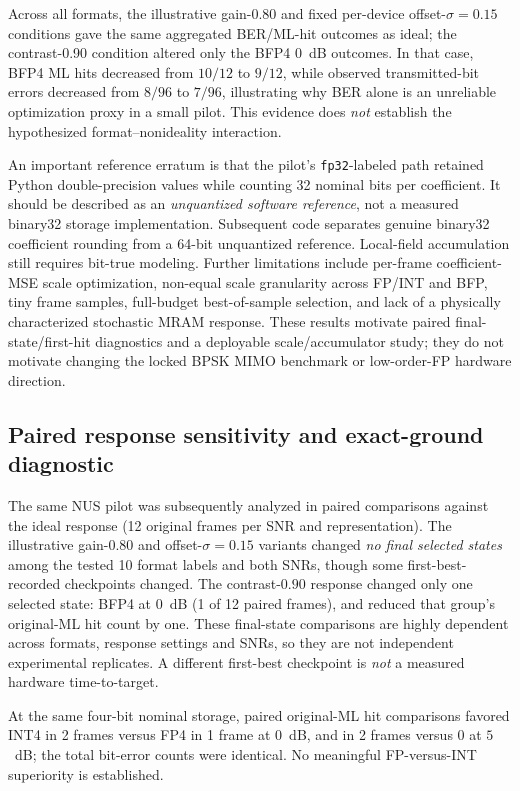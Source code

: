 \documentclass[11pt,a4paper]{article}
\begin{document}
Across all formats, the illustrative gain-0.80 and fixed per-device
offset-$\sigma=0.15$ conditions gave the same aggregated BER/ML-hit
outcomes as ideal; the contrast-0.90 condition altered only the BFP4
0~dB outcomes. In that case, BFP4 ML hits decreased from $10/12$ to
$9/12$, while observed transmitted-bit errors decreased from $8/96$
to $7/96$, illustrating why BER alone is an unreliable optimization
proxy in a small pilot. This evidence does \emph{not} establish the
hypothesized format--nonideality interaction.

An important reference erratum is that the pilot's
\texttt{fp32}-labeled path retained Python double-precision values while
counting 32 nominal bits per coefficient. It should be described as an
\emph{unquantized software reference}, not a measured binary32 storage
implementation. Subsequent code separates genuine binary32 coefficient
rounding from a 64-bit unquantized reference. Local-field accumulation
still requires bit-true modeling. Further limitations include per-frame
coefficient-MSE scale optimization, non-equal scale granularity across
FP/INT and BFP, tiny frame samples, full-budget best-of-sample selection,
and lack of a physically characterized stochastic MRAM response.
These results motivate paired final-state/first-hit diagnostics and
a deployable scale/accumulator study; they do not motivate changing
the locked BPSK MIMO benchmark or low-order-FP hardware direction.

\subsection{Paired response sensitivity and exact-ground diagnostic}
The same NUS pilot was subsequently analyzed in paired comparisons against
the ideal response (12 original frames per SNR and representation).
The illustrative gain-$0.80$ and offset-$\sigma=0.15$ variants changed
\emph{no final selected states} among the tested 10 format labels and both
SNRs, though some first-best-recorded checkpoints changed.
The contrast-$0.90$ response changed only one selected state:
BFP4 at $0$~dB (1 of 12 paired frames), and reduced that group's
original-ML hit count by one. These final-state comparisons are highly
dependent across formats, response settings and SNRs, so they are not
independent experimental replicates. A different first-best checkpoint
is \emph{not} a measured hardware time-to-target.

At the same four-bit nominal storage, paired original-ML hit comparisons
favored INT4 in 2 frames versus FP4 in 1 frame at $0$~dB, and
in 2 frames versus 0 at $5$~dB; the total bit-error counts were
identical. No meaningful FP-versus-INT superiority is established.
\end{document}
